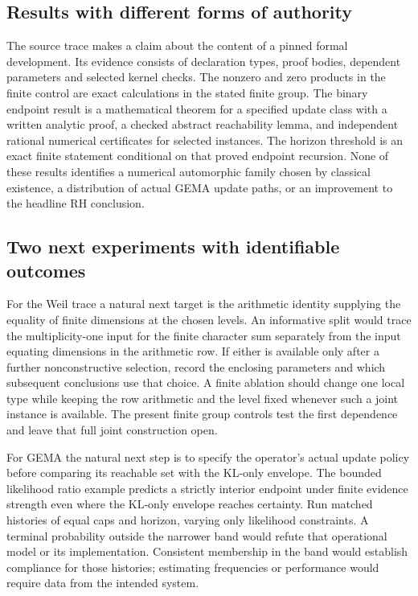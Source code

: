 \documentclass[12pt,letterpaper]{article}
\begin{document}
\subsection{Results with different forms of authority}
The source trace makes a claim about the content of a pinned formal development. Its evidence consists of declaration types, proof bodies, dependent parameters and selected kernel checks. The nonzero and zero products in the finite control are exact calculations in the stated finite group. The binary endpoint result is a mathematical theorem for a specified update class with a written analytic proof, a checked abstract reachability lemma, and independent rational numerical certificates for selected instances. The horizon threshold is an exact finite statement conditional on that proved endpoint recursion. None of these results identifies a numerical automorphic family chosen by classical existence, a distribution of actual GEMA update paths, or an improvement to the headline RH conclusion.

\subsection{Two next experiments with identifiable outcomes}
For the Weil trace a natural next target is the arithmetic identity supplying the equality of finite dimensions at the chosen levels. An informative split would trace the multiplicity-one input for the finite character sum separately from the input equating dimensions in the arithmetic row. If either is available only after a further nonconstructive selection, record the enclosing parameters and which subsequent conclusions use that choice. A finite ablation should change one local type while keeping the row arithmetic and the level fixed whenever such a joint instance is available. The present finite group controls test the first dependence and leave that full joint construction open.

For GEMA the natural next step is to specify the operator's actual update policy before comparing its reachable set with the KL-only envelope. The bounded likelihood ratio example predicts a strictly interior endpoint under finite evidence strength even where the KL-only envelope reaches certainty. Run matched histories of equal caps and horizon, varying only likelihood constraints. A terminal probability outside the narrower band would refute that operational model or its implementation. Consistent membership in the band would establish compliance for those histories; estimating frequencies or performance would require data from the intended system.
\end{document}
